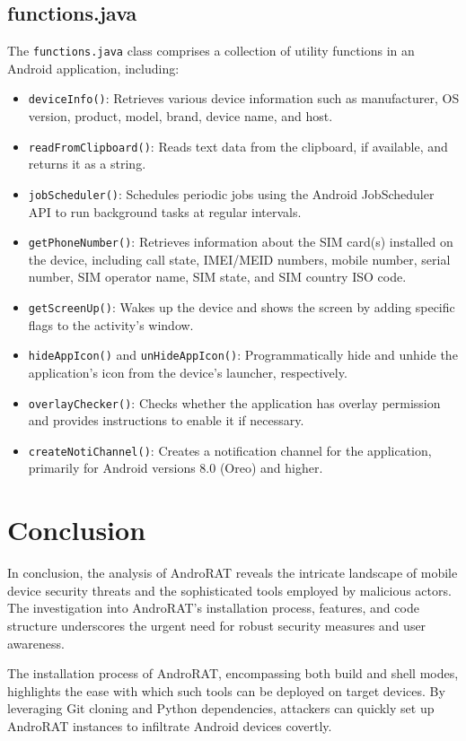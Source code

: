 \documentclass[12pt]{article}
\begin{document}
\subsection{functions.java}
The \texttt{functions.java} class comprises a collection of utility functions in an Android application, including:
\begin{itemize}
    \item \texttt{deviceInfo()}: Retrieves various device information such as manufacturer, OS version, product, model, brand, device name, and host.
    \item \texttt{readFromClipboard()}: Reads text data from the clipboard, if available, and returns it as a string.
    \item \texttt{jobScheduler()}: Schedules periodic jobs using the Android JobScheduler API to run background tasks at regular intervals.
    \item \texttt{getPhoneNumber()}: Retrieves information about the SIM card(s) installed on the device, including call state, IMEI/MEID numbers, mobile number, serial number, SIM operator name, SIM state, and SIM country ISO code.
    \item \texttt{getScreenUp()}: Wakes up the device and shows the screen by adding specific flags to the activity's window.
    \item \texttt{hideAppIcon()} and \texttt{unHideAppIcon()}: Programmatically hide and unhide the application's icon from the device's launcher, respectively.
    \item \texttt{overlayChecker()}: Checks whether the application has overlay permission and provides instructions to enable it if necessary.
    \item \texttt{createNotiChannel()}: Creates a notification channel for the application, primarily for Android versions 8.0 (Oreo) and higher.
\end{itemize}

\section{Conclusion}
In conclusion, the analysis of AndroRAT reveals the intricate landscape of mobile device security threats and the sophisticated tools employed by malicious actors. The investigation into AndroRAT's installation process, features, and code structure underscores the urgent need for robust security measures and user awareness.

The installation process of AndroRAT, encompassing both build and shell modes, highlights the ease with which such tools can be deployed on target devices. By leveraging Git cloning and Python dependencies, attackers can quickly set up AndroRAT instances to infiltrate Android devices covertly.
\end{document}
